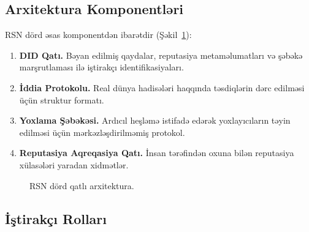 \documentclass[11pt,a4paper,twocolumn]{article}
\begin{document}
\subsection{Arxitektura Komponentləri}

RSN dörd əsas komponentdən ibarətdir (Şəkil~\ref{fig:architecture}):
\begin{enumerate}[nosep]
\item \textbf{DID Qatı.} Bəyan edilmiş qaydalar, reputasiya metaməlumatları və şəbəkə marşrutlaması ilə iştirakçı identifikasiyaları.
\item \textbf{İddia Protokolu.} Real dünya hadisələri haqqında təsdiqlərin dərc edilməsi üçün struktur formatı.
\item \textbf{Yoxlama Şəbəkəsi.} Ardıcıl heşləmə istifadə edərək yoxlayıcıların təyin edilməsi üçün mərkəzləşdirilməmiş protokol.
\item \textbf{Reputasiya Aqreqasiya Qatı.} İnsan tərəfindən oxuna bilən reputasiya xülasələri yaradan xidmətlər.
\end{enumerate}

\begin{figure}[ht]
\centering
{}
\caption{RSN dörd qatlı arxitektura.}
\label{fig:architecture}
\end{figure}

\subsection{İştirakçı Rolları}
\end{document}
